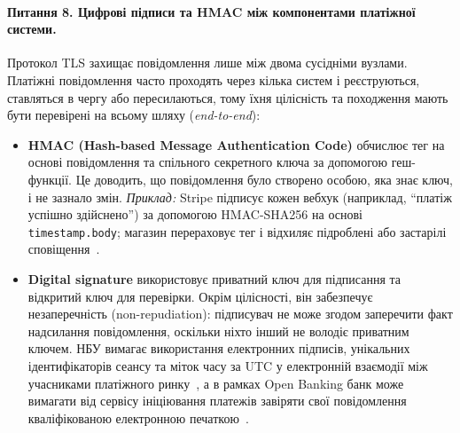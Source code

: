 \paragraph{Питання 8. Цифрові підписи та HMAC між компонентами платіжної системи.}
Протокол TLS захищає повідомлення лише між двома сусідніми вузлами. Платіжні повідомлення часто проходять через 
кілька систем і реєструються, ставляться в чергу або пересилаються, тому їхня цілісність та походження мають 
бути перевірені на всьому шляху (\emph{end-to-end}):
\begin{itemize}[noitemsep]
    \item \textbf{HMAC (Hash-based Message Authentication Code)} обчислює тег на основі повідомлення та спільного 
        секретного ключа за допомогою геш-функції\cite{rfc2104}. Це доводить, що повідомлення було створено особою, 
        яка знає ключ, і не зазнало змін. \textit{Приклад:} Stripe підписує кожен вебхук (наприклад, \enquote{платіж 
        успішно здійснено}) за допомогою HMAC-SHA256 на основі \texttt{timestamp.body}; магазин перераховує тег і відхиляє 
        підроблені або застарілі сповіщення~\cite{stripe_webhook_signature}.
    \item \textbf{Digital signature} використовує приватний ключ для підписання та відкритий ключ для перевірки. 
        Окрім цілісності, він забезпечує незаперечність (non-repudiation): підписувач не може згодом заперечити факт 
        надсилання  повідомлення, оскільки ніхто інший не володіє приватним ключем. НБУ вимагає використання електронних 
        підписів, унікальних ідентифікаторів сеансу та міток часу за UTC у електронній взаємодії між учасниками платіжного 
        ринку~\cite[п.~74--75]{nbu58}, а в рамках Open Banking банк може вимагати від сервісу ініціювання платежів 
        завіряти свої повідомлення кваліфікованою електронною печаткою~\cite[п.~30]{nbu80}.
\end{itemize}

